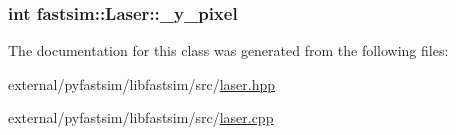 \subsubsection[{\texorpdfstring{\+\_\+y\+\_\+pixel}{_y_pixel}}]{\setlength{\rightskip}{0pt plus 5cm}int fastsim\+::\+Laser\+::\+\_\+y\+\_\+pixel\hspace{0.3cm}{\ttfamily [protected]}}\hypertarget{classfastsim_1_1_laser_a2e07a5246699632a0de91cb3ed6932d9}{}\label{classfastsim_1_1_laser_a2e07a5246699632a0de91cb3ed6932d9}


The documentation for this class was generated from the following files\+:\begin{DoxyCompactItemize}
\item 
external/pyfastsim/libfastsim/src/\hyperlink{laser_8hpp}{laser.\+hpp}\item 
external/pyfastsim/libfastsim/src/\hyperlink{laser_8cpp}{laser.\+cpp}\end{DoxyCompactItemize}
